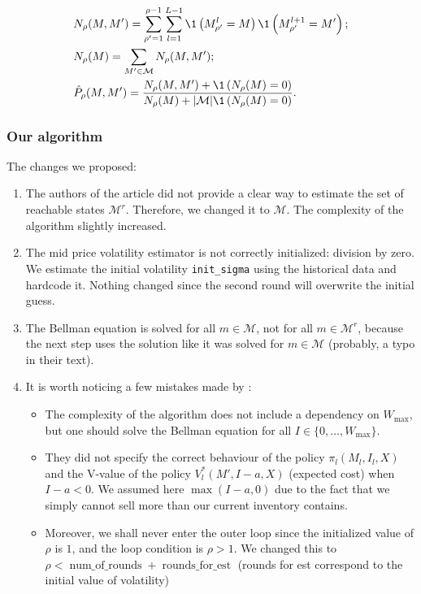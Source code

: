            \begin{align}
                & N_\rho(M, M') = \sum_{\rho' = 1}^{\rho-1} \sum_{l = 1}^{L-1} \1\left(M_{\rho'}^l = M\right) \1\left(M_{\rho'}^{l+1} = M'\right); \label{globe:rule1}\\
                & N_\rho(M) = \sum_{M'\in\mathcal{M}}N_\rho(M, M'); \label{globe:rule2}\\
                & \hat P_\rho(M, M') = \frac{N_\rho(M, M') + \1\left(N_\rho(M) = 0\right)}{N_\rho(M) + |\mathcal M|\1\left(N_\rho(M) = 0\right)}. \label{globe:rule3}
            \end{align}

        \subsubsection{Our algorithm}
            The changes we proposed:
            \begin{enumerate}
                \item The authors of the article did not provide a clear way to estimate the set of reachable states $\mathcal{M}^r$. Therefore, we changed it to $\mathcal{M}$. The complexity of the algorithm slightly increased.
                \item The mid price volatility estimator is not correctly initialized: division by zero. We estimate the initial volatility \texttt{init\_sigma} using the historical data and hardcode it. Nothing changed since the second round will overwrite the initial guess.
                \item The Bellman equation is solved for all $m \in \mathcal M$, not for all $m \in \mathcal M^r$, because the next step uses the solution like it was solved for $m \in \mathcal M$ (probably, a typo in their text).
                \item It is worth noticing a few mistakes made by \citeauthor{Akbarzadeh2018}:
                \begin{itemize}
                    \item The complexity of the algorithm does not include a dependency on $W_{\text{max}}$, but one should solve the Bellman equation for all $I\in \{0, \dots, W_{\text{max}}\}$.
                    \item They did not specify the correct behaviour of the policy $\pi_l(M_l, I_l, X)$ and the V-value of the policy $V^*_l(M', I - a, X)$ (expected cost) when $I-a < 0$. We assumed here $\max(I-a, 0)$ due to the fact that we simply cannot sell more than our current inventory contains.
                    \item Moreover, we shall never enter the outer loop since the initialized value of $\rho$ is $1$, and the loop condition is $\rho > 1$. We changed this to $\rho < \operatorname{num\_of\_rounds} + \operatorname{rounds\_for\_est}$ (rounds for est correspond to the initial value of volatility)
                \end{itemize}
            \end{enumerate}

